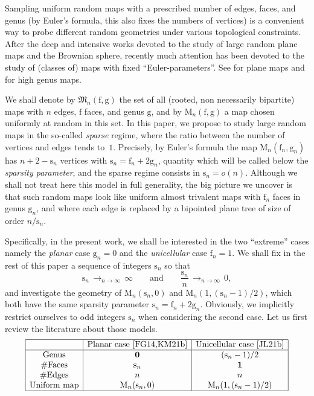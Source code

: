 \documentclass[JEP,XML,SOM,Unicode,NoFloatCountersInSection,NoEqCountersInSection]{cedram}
\theoremstyle{plain}
\theoremstyle{definition}
\theoremstyle{remark}
\newcommand{\Map}{\mathrm{M}}
\newcommand{\face}{\mathrm{f}}
\newcommand{\gen}{\mathrm{g}}
\newcommand{\spar}{\mathrm{s}}
\newcommand{\cv}[1][n]{\,\mathop{\longrightarrow}^{}_{#1 \to \infty}\,}
\begin{document}
Sampling uniform random maps with a prescribed number of edges, faces, and genus (by Euler's formula, this also fixes the numbers of vertices) is a convenient way to probe different random geometries under various topological constraints. After the deep and intensive works devoted to the study of large random plane maps and the Brownian sphere, recently much attention has been devoted to the study of (classes of) maps with fixed ``Euler-parameters''.
See \eg \cite{FG14,KM21b} for plane maps and~\cite{BL21,BL22,Ray15,ACCR13,Lou21,JL21b} for high genus maps.

We shall denote by $\mathfrak{M}_n{(\face,\gen)}$ the set of all (rooted, non necessarily bipartite) maps with $n$ edges, $ \face$ faces, and genus $ \gen$, and by $ \Map_n{(\face,\gen)}$ a map chosen uniformly at random in this set. In this paper, we propose to study large random maps in the so-called \emph{sparse} regime, where the ratio between the number of vertices and edges tends to~$1$. Precisely, by Euler's formula the map $ \Map_n(\face_n, \gen_n)$ has $n+2- \spar_n$ vertices with $\spar_n = \face_n + 2 \gen_n$, quantity which will be called below the \emph{sparsity parameter}, and the sparse regime consists in $\spar_n = o(n)$.
Although we shall not treat here this model in full generality, the big picture we uncover is that such random maps look like uniform almost trivalent maps with $\face_n$ faces in genus $ \gen_n$, and where each edge is replaced by a bipointed plane tree of size of order $n/\spar_n$.

Specifically, in the present work, we shall be interested in the two ``extreme'' cases namely the \emph{planar} case $ \gen_n=0$ and the \emph{unicellular} case $ \face_n = 1$. We shall fix in the rest of this paper a sequence of integers $\spar_n$ so that
\begin{equation}\label{eq:standing}
\spar_n \cv \infty \qquad \text{and} \qquad \frac{\spar_n}{n} \cv 0,
\end{equation}
and investigate the geometry of $ \Map_n{(\spar_n,0)}$ and $ \Map_n{(1, (\spar_n-1)/2)}$, which both have the same sparsity parameter $\spar_n = \face_n + 2 \gen_n$.
Obviously, we implicitly restrict ourselves to odd integers $\spar_n$ when considering the second case.
Let us first review the literature about those models.
\[
\begin{array}{|c|c|c|}
\hline
& \mbox{Planar case~\cite{FG14,KM21b}} & \mbox{Unicellular case~\cite{JL21b}} \\
\hline
\mbox{Genus} & \mathbf{0} & (\spar_n-1)/2 \\
\#\mbox{Faces} & \spar_n & \mathbf{1} \\
\#\mbox{Edges} & n & n \\
\mbox{Uniform map} & \Map_n(\spar_n,0) & \displaystyle \Map_n(1, (\spar_n-1)/2)\\
\hline
\end{array}
\]
\end{document}
